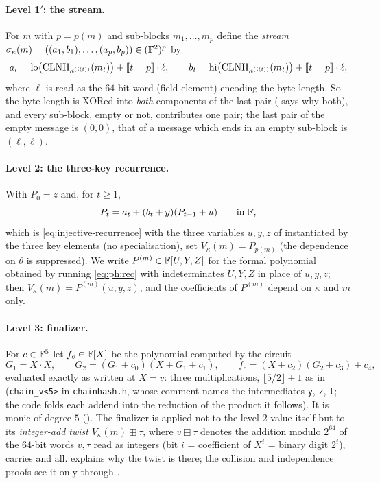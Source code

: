 \paragraph{Level 1$'$: the stream.}
For $m$ with $p=p(m)$ and sub-blocks $m_1,\dots,m_p$ define the
\emph{stream} $\sigma_\kappa(m)=((a_1,b_1),\dots,(a_p,b_p))\in(\mathbb{F}^2)^p$ by
\begin{equation}\label{eq:ph:stream}
  a_t=\mathrm{lo}\bigl(\mathrm{CLNH}_{\kappa^{(i(t))}}(m_t)\bigr)+[\![t=p]\!]\cdot\ell,\qquad
  b_t=\mathrm{hi}\bigl(\mathrm{CLNH}_{\kappa^{(i(t))}}(m_t)\bigr)+[\![t=p]\!]\cdot\ell,
\end{equation}
where $\ell$ is read as the $64$-bit word (field element) encoding the byte
length.  So the byte length is XORed into \emph{both} components of the last
pair ( says why both), and every sub-block, empty or
not, contributes one pair; the last pair of the empty message is $(0,0)$,
that of a message which ends in an empty sub-block is $(\ell,\ell)$.

\paragraph{Level 2: the three-key recurrence.}
With $P_0=z$ and, for $t\ge1$,
\begin{equation}\label{eq:ph:rec}
  P_t=a_t+(b_t+y)(P_{t-1}+u)\qquad\text{in }\mathbb{F} ,
\end{equation}
which is \eqref{eq:injective-recurrence} with the three variables $u,y,z$ of
 instantiated by the three key elements
(no specialisation), set $V_\kappa(m)=P_{p(m)}$ (the dependence on $\theta$
is suppressed).  We write $P^{(m)}\in\mathbb{F}[U,Y,Z]$ for the formal polynomial
obtained by running \eqref{eq:ph:rec} with indeterminates $U,Y,Z$ in place of
$u,y,z$; then $V_\kappa(m)=P^{(m)}(u,y,z)$, and the coefficients of $P^{(m)}$
depend on $\kappa$ and $m$ only.

\paragraph{Level 3: finalizer.}
For $c\in\mathbb{F}^5$ let $f_c\in\mathbb{F}[X]$ be the polynomial computed by the circuit
\begin{equation}\label{eq:ph:chain5}
  G_1=X\cdot X,\qquad
  G_2=(G_1+c_0)(X+G_1+c_1),\qquad
  f_c=(X+c_2)(G_2+c_3)+c_4 ,
\end{equation}
evaluated exactly as written at $X=v$: three multiplications,
$\lfloor5/2\rfloor+1$ as in  (\texttt{chain\_v<5>} in
\texttt{chainhash.h}, whose comment names the intermediates \texttt{y},
\texttt{z}, \texttt{t}; the code folds each addend into the reduction of
the product it follows).  It is monic of degree $5$ ().
The finalizer is applied not to the level-2 value itself but to its
\emph{integer-add twist} $V_\kappa(m)\boxplus\tau$, where $v\boxplus\tau$
denotes the addition modulo $2^{64}$ of the $64$-bit words $v,\tau$ read as
integers (bit $i$ = coefficient of $X^i$ = binary digit $2^i$), carries and
all.   explains why the twist is there; the collision and
independence proofs see it only through .

